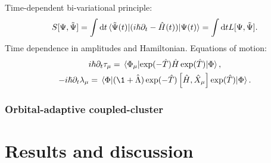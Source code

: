 \documentclass{beamer}
\begin{document}
\begin{frame}
    Time-dependent bi-variational principle:
    \begin{align}
        S[\Psi, \tilde{\Psi}]
        =
        \int \dd t
        \mel*{\tilde{\Psi}(t)}{
            (i\hslash\partial_t - \hat{H}(t))
        }{\Psi(t)}
        = \int \dd t
        L[\Psi, \tilde{\Psi}].
    \end{align}
    Time dependence in amplitudes and Hamiltonian.
    Equations of motion:
    \begin{gather}
        i\hslash\partial_t\clustamp_{\mu}
        = \mel*{\slat_{\mu}}{
            \exponential(-\clust)
            \hamil
            \exponential(\clust)
        }{\slat},
        \\
        -i\hslash\partial_t\clustlamp_{\mu}
        = \mel*{\slat}{
            (\1 + \clustl)
            \exponential(-\clust)
            \com{\hamil}{\hat{X}_{\mu}}
            \exponential(\clust)
        }{\slat}.
    \end{gather}
\end{frame}

\begin{frame}
    \frametitle{Orbital-adaptive coupled-cluster}
\end{frame}

\section{Results and discussion}
\end{document}
